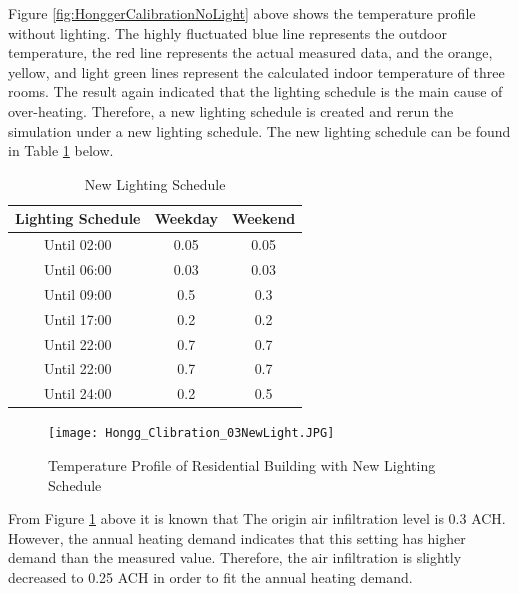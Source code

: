 			Figure \ref{fig:HonggerCalibrationNoLight} above shows the temperature profile without lighting. The highly fluctuated blue line represents the outdoor temperature, the red line represents the actual measured data, and the orange, yellow, and light green lines represent  the calculated indoor temperature of three rooms. The result again indicated that the lighting schedule is the main cause of over-heating. Therefore, a new lighting schedule is created and rerun the simulation under a new lighting schedule. The new lighting schedule can be found in Table \ref{tab:HonggLightingCtrl} below.
			
        	\begin{table}[htbp]
        	\centering
        	\caption{New Lighting Schedule}
        	    \begin{tabular}{ccc}
        	    \toprule
        	    Lighting Schedule & Weekday & Weekend\\
        	    \midrule
                Until 02:00 & 0.05 & 0.05 \\
                Until 06:00 & 0.03 & 0.03\\
                Until 09:00 & 0.5 & 0.3\\
                Until 17:00 & 0.2 & 0.2\\
                Until 22:00 & 0.7 & 0.7\\
                Until 22:00 & 0.7 & 0.7\\
                Until 24:00 & 0.2 & 0.5\\
        	    \bottomrule
        	    \end{tabular}%
        	  \label{tab:HonggLightingCtrl}%
        	\end{table}%
			
			
			\begin{figure}[H]
			\centering
			\texttt{[image: Hongg\_Clibration\_03NewLight.JPG]}
			\caption{Temperature Profile of Residential Building with New Lighting Schedule}
			\label{fig:HonggerCalibrationNewLight}
			\end{figure}
			
			From Figure \ref{fig:HonggerCalibrationNewLight} above it is known that
			The origin air infiltration level is 0.3 ACH. However, the annual heating demand indicates that this setting has higher demand than the measured value. Therefore, the air infiltration is slightly decreased to 0.25 ACH in order to fit the annual heating demand.\\ 


